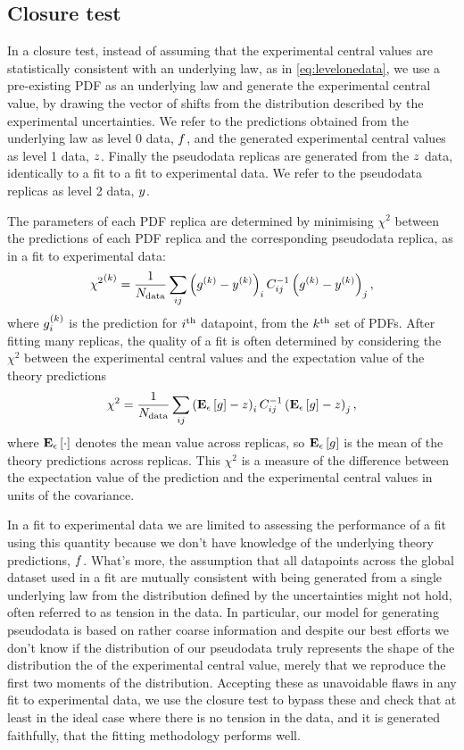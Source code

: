 \subsection{Closure test}

In a closure test, instead of assuming that the experimental central values are
statistically consistent with an underlying law, as in \eqref{eq:levelonedata},
we use a pre-existing PDF as an underlying law and generate the experimental
central value, by drawing the vector of shifts from the distribution
described by the experimental uncertainties. We refer to the predictions
obtained from the underlying law as level 0 data, $f$, and the generated
experimental central values as level 1 data, $z$. Finally the pseudodata
replicas are generated from the $z$ data, identically to a fit to
a fit to experimental data. We refer to the pseudodata replicas as level 2
data, $y$.

The parameters of each PDF replica are determined by minimising $\chi^2$ between
the predictions of each PDF replica and the corresponding pseudodata replica,
as in a fit to experimental data:
\begin{equation}
    {\chi^2}^{(k)} = \frac{1}{N_{\rm data}} \sum_{ij} \left( g^{(k)} - y^{(k)} \right)_i C^{-1}_{ij} \left( g^{(k)} - y^{(k)} \right)_j,
\end{equation}
where $g^{(k)}_i$ is the prediction for $i^{\rm th}$ datapoint, from
the $k^{\rm th}$ set of PDFs. After fitting many replicas, the quality of a fit
is often determined by considering the $\chi^2$ between the experimental central
values and the expectation value of the theory predictions
\begin{equation}\label{eq:centralchi2}
    \chi^2 = \frac{1}{N_{\rm data}} \sum_{ij} \left( \mathbf{E}_{\epsilon}\left[ g \right] - z \right)_i C^{-1}_{ij} \left( \mathbf{E}_{\epsilon}\left[ g \right] - z \right)_j,
\end{equation}
where $\mathbf{E}_{\epsilon}\left[ \cdot \right]$ denotes the mean value across replicas, so $\mathbf{E}_{\epsilon}\left[ g \right]$ is
the mean of the theory predictions across replicas. This $\chi^2$ is a measure
of the difference between the expectation value of the prediction and the
experimental central values in units of the covariance.

In a fit to experimental data we are limited to assessing the performance of a fit
using this quantity because we don't
have knowledge of the underlying theory predictions, $f$. What's more, the
assumption that all datapoints across the global dataset used in a fit are
mutually consistent with being generated from a single underlying law from
the distribution defined by the uncertainties might not hold, often
referred to as tension in the data. In particular, our model for generating pseudodata
is based on rather coarse information and despite our best efforts we don't know
if the distribution of our pseudodata truly represents the shape of the distribution
the of the experimental central value, merely that we reproduce the first
two moments of the distribution. Accepting these as unavoidable flaws in any
fit to experimental data, we use the closure test to bypass these and check that
at least in the ideal case where there is no tension in the data, and it is
generated faithfully, that the fitting methodology performs well.
